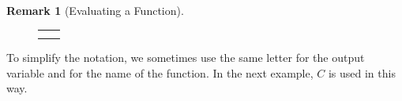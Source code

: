 \documentclass[10pt,]{book}
\theoremstyle{plain}
\theoremstyle{definition}
\newtheorem{remark}[theorem]{Remark}
\theoremstyle{definition}
\theoremstyle{definition}
\theoremstyle{definition}
\numberwithin{equation}{part}
\newlength{\panelmax}
\begin{document}
\begin{remark}[Evaluating a Function]
{{}
\newlength{\phBAimage}\setlength{\phBAimage}{\ht\panelboxBAimage+\dp\panelboxBAimage}
\settototalheight{\phBAimage}{\usebox{\panelboxBAimage}}
\setlength{\panelmax}{\maxof{\panelmax}{\phBAimage}}
\newsavebox{\panelboxBBimage}
\newlength{\phBBimage}\setlength{\phBBimage}{\ht\panelboxBBimage+\dp\panelboxBBimage}
\settototalheight{\phBBimage}{\usebox{\panelboxBBimage}}
\setlength{\panelmax}{\maxof{\panelmax}{\phBBimage}}
\leavevmode%
\setlength{\tabcolsep}{0\textwidth}
\begin{figure}
\begin{tabular}{@{}*{2}{c}@{}}
\begin{minipage}[c][\panelmax][t]{0.5\textwidth}\usebox{\panelboxBAimage}\end{minipage}&
\begin{minipage}[c][\panelmax][t]{0.5\textwidth}\usebox{\panelboxBBimage}\end{minipage}\tabularnewline
\parbox[t]{0.5\textwidth}{
}&
\parbox[t]{0.5\textwidth}{
}\end{tabular}
\end{figure}
}%
%
\end{remark}
To simplify the notation, we sometimes use the same letter for the output variable and for the name of the function. In the next example, \(C\) is used in this way.%
\end{document}
